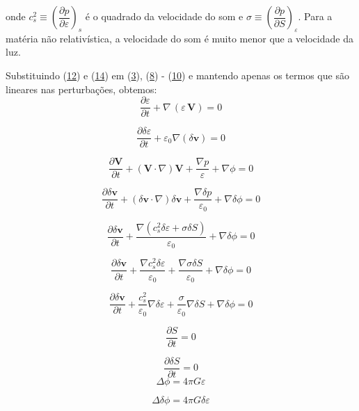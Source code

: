 \documentclass[a4paper,12pt]{article}
\begin{document}
onde $c^2_s \equiv \left(\dfrac{\partial p}{\partial\varepsilon}\right)_s$ é o quadrado da velocidade do som e $\sigma \equiv \left(\dfrac{\partial p}{\partial S}\right)_\varepsilon$. Para a matéria não relativística, a velocidade do som é muito menor que a velocidade da luz.

Substituindo (\hyperref[eq12]{12}) e (\hyperref[eq14]{14}) em (\hyperref[eq3]{3}), (\hyperref[eq8]{8}) - (\hyperref[eq10]{10}) e mantendo apenas os termos
que são lineares nas perturbações, obtemos:
\newline
$$\dfrac{\partial \varepsilon}{\partial t} +\nabla \,(\varepsilon \, \textbf{V}) = 0$$

\begin{equation}\label{eq15}
	\dfrac{\partial\delta\varepsilon}{\partial t} + \varepsilon_0 \nabla (\delta\textbf{v}) = 0
\end{equation}
\newline

$$\dfrac{\partial\textbf{V}}{\partial t} + (\textbf{V} \cdot \nabla ) \textbf{V} + \frac{\nabla p}{\varepsilon} + \nabla \phi =0$$

$$\dfrac{\partial\delta\textbf{v}}{\partial t} + (\delta\textbf{v} \cdot \nabla ) \delta\textbf{v} + \frac{\nabla \delta p}{\varepsilon_0} + \nabla \delta\phi =0$$

$$\dfrac{\partial\delta\textbf{v}}{\partial t} + \frac{\nabla (c_s^2\delta\varepsilon + \sigma\delta S )}{\varepsilon_0} + \nabla \delta\phi =0$$

$$\dfrac{\partial\delta\textbf{v}}{\partial t} +\frac{\nabla c_s^2\delta\varepsilon }{\varepsilon_0} + \frac{\nabla \sigma\delta S }{\varepsilon_0} + \nabla \delta\phi =0$$

\begin{equation}\label{eq16}
	\dfrac{\partial\delta\textbf{v}}{\partial t} + \dfrac{c^2_s}{\varepsilon_0} \nabla\delta\varepsilon + \dfrac{\sigma}{\varepsilon_0}\nabla\delta S + \nabla\delta\phi = 0
\end{equation}
\newline

$$\dfrac{\partial S}{\partial t} = 0$$

\begin{equation}\label{eq17}
	\dfrac{\partial\delta S}{\partial t} = 0
\end{equation}
\newline
$$\Delta\phi = 4\pi G\varepsilon$$

\begin{equation}\label{eq18}
	\Delta\delta\phi = 4\pi G\delta\varepsilon
\end{equation}
\end{document}
